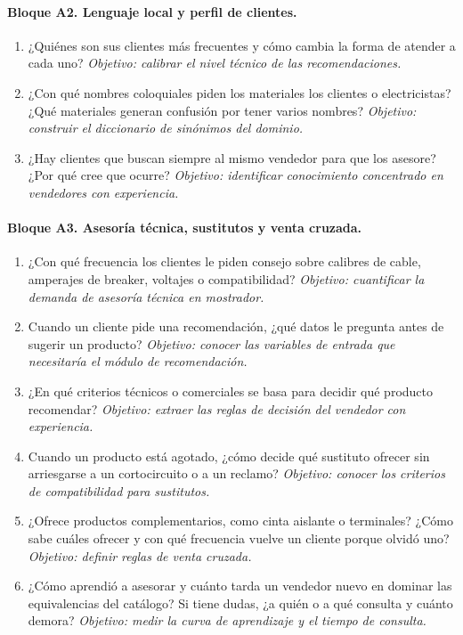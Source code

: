 \paragraph{Bloque A2. Lenguaje local y perfil de clientes.}
\begin{enumerate}[label=A2.\arabic*, leftmargin=*]
\item ¿Quiénes son sus clientes más frecuentes y cómo cambia la forma de atender a cada uno? \emph{Objetivo: calibrar el nivel técnico de las recomendaciones.}
\item ¿Con qué nombres coloquiales piden los materiales los clientes o electricistas? ¿Qué materiales generan confusión por tener varios nombres? \emph{Objetivo: construir el diccionario de sinónimos del dominio.}
\item ¿Hay clientes que buscan siempre al mismo vendedor para que los asesore? ¿Por qué cree que ocurre? \emph{Objetivo: identificar conocimiento concentrado en vendedores con experiencia.}
\end{enumerate}

\paragraph{Bloque A3. Asesoría técnica, sustitutos y venta cruzada.}
\begin{enumerate}[label=A3.\arabic*, leftmargin=*]
\item ¿Con qué frecuencia los clientes le piden consejo sobre calibres de cable, amperajes de breaker, voltajes o compatibilidad? \emph{Objetivo: cuantificar la demanda de asesoría técnica en mostrador.}
\item Cuando un cliente pide una recomendación, ¿qué datos le pregunta antes de sugerir un producto? \emph{Objetivo: conocer las variables de entrada que necesitaría el módulo de recomendación.}
\item ¿En qué criterios técnicos o comerciales se basa para decidir qué producto recomendar? \emph{Objetivo: extraer las reglas de decisión del vendedor con experiencia.}
\item Cuando un producto está agotado, ¿cómo decide qué sustituto ofrecer sin arriesgarse a un cortocircuito o a un reclamo? \emph{Objetivo: conocer los criterios de compatibilidad para sustitutos.}
\item ¿Ofrece productos complementarios, como cinta aislante o terminales? ¿Cómo sabe cuáles ofrecer y con qué frecuencia vuelve un cliente porque olvidó uno? \emph{Objetivo: definir reglas de venta cruzada.}
\item ¿Cómo aprendió a asesorar y cuánto tarda un vendedor nuevo en dominar las equivalencias del catálogo? Si tiene dudas, ¿a quién o a qué consulta y cuánto demora? \emph{Objetivo: medir la curva de aprendizaje y el tiempo de consulta.}
\end{enumerate}

